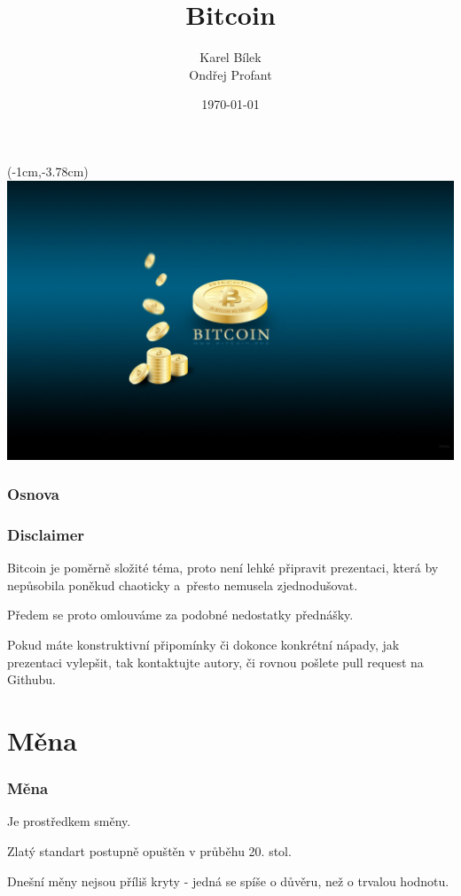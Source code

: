 \documentclass[xetex]{beamer}
\title{Bitcoin}
\author{Karel Bílek\\Ondřej Profant}
\institute[Piráti]{Česká pirátská strana}
\date{\today}
\begin{document}
\begin{frame}
	\begin{textblock*}{0cm}(-1cm,-3.78cm)
  \includegraphics[scale=0.6]{images/intro.jpg}
  \end{textblock*}
\end{frame}

\begin{frame}
  \titlepage
\end{frame}

\begin{frame}
  \frametitle{Osnova}
  \tableofcontents
\end{frame}	

\begin{frame}
	\frametitle{Disclaimer}
	Bitcoin je poměrně složité téma, proto není lehké připravit prezentaci, která by nepůsobila poněkud chaoticky
	a~přesto nemusela zjednodušovat.

	\bigskip

	Předem se proto omlouváme za podobné nedostatky přednášky.

	\bigskip

	Pokud máte konstruktivní připomínky či dokonce konkrétní nápady, jak prezentaci vylepšit, tak kontaktujte autory, či rovnou pošlete pull request na Githubu.
\end{frame}

\section{Měna}

\begin{frame}
	\frametitle{Měna}
	Je prostředkem směny.

	\bigskip

	Zlatý standart postupně opuštěn v průběhu 20. stol.

	Dnešní měny nejsou příliš kryty - jedná se spíše o důvěru, než o trvalou hodnotu.
\end{frame}
\end{document}
